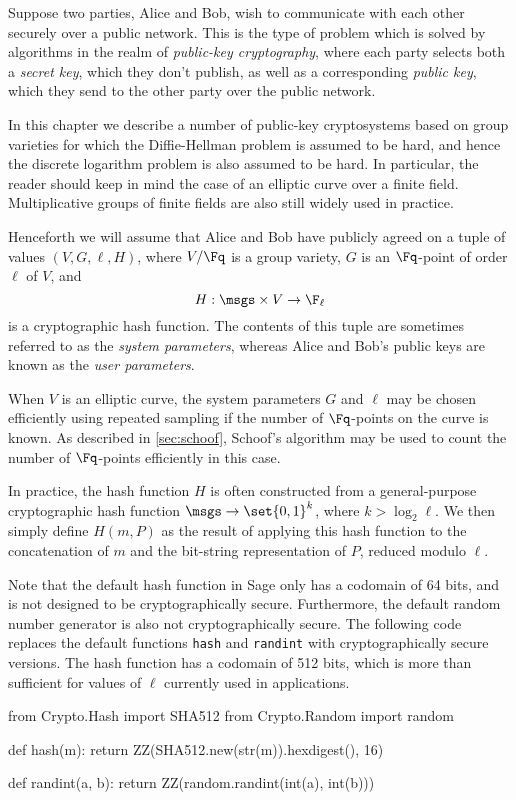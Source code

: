 
Suppose two parties, Alice and Bob, wish to communicate with each other securely over a public network. This is the type of problem which is solved by algorithms in the realm of \emph{public-key cryptography}, where each party selects both a \emph{secret key}, which they don't publish, as well as a corresponding \emph{public key}, which they send to the other party over the public network.

In this chapter we describe a number of public-key cryptosystems based on group varieties for which the Diffie-Hellman problem is assumed to be hard, and hence the discrete logarithm problem is also assumed to be hard. In particular, the reader should keep in mind the case of an elliptic curve over a finite field. Multiplicative groups of finite fields are also still widely used in practice.

Henceforth we will assume that Alice and Bob have publicly agreed on a tuple of values $(V, G, \ell, H)$, where $V / \Fq$ is a group variety, $G$ is an $\Fq$-point of order $\ell$ of $V$, and
\[H : \msgs \times V \to \F_\ell\]
is a cryptographic hash function. The contents of this tuple are sometimes referred to as the \emph{system parameters}, whereas Alice and Bob's public keys are known as the \emph{user parameters}.

When $V$ is an elliptic curve, the system parameters $G$ and $\ell$ may be chosen efficiently using repeated sampling if the number of $\Fq$-points on the curve is known. As described in \cref{sec:schoof}, Schoof's algorithm may be used to count the number of $\Fq$-points efficiently in this case.

In practice, the hash function $H$ is often constructed from a general-purpose cryptographic hash function $\msgs \to \set{0, 1}^k$, where $k > \log_2 \ell$. We then simply define $H(m, P)$ as the result of applying this hash function to the concatenation of $m$ and the bit-string representation of $P$, reduced modulo $\ell$.

Note that the default hash function in Sage only has a codomain of 64 bits, and is not designed to be cryptographically secure. Furthermore, the default random number generator is also not cryptographically secure. The following code replaces the default functions \texttt{hash} and \texttt{randint} with cryptographically secure versions. The hash function has a codomain of 512 bits, which is more than sufficient for values of $\ell$ currently used in applications.

\begin{sagecode}
from Crypto.Hash import SHA512
from Crypto.Random import random

def hash(m):
    return ZZ(SHA512.new(str(m)).hexdigest(), 16)

def randint(a, b):
    return ZZ(random.randint(int(a), int(b)))
\end{sagecode}
